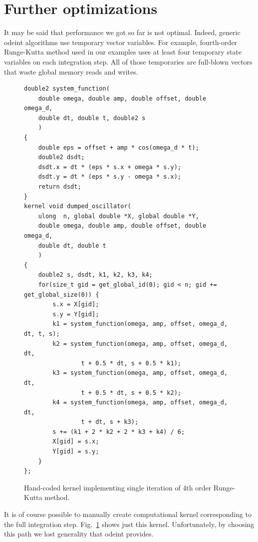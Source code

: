 \documentclass[1p]{elsarticle}
\newcommand{\figref}[1]{Fig.~\ref{#1}}
\begin{document}
\section{Further optimizations}

It may be said that performance we got so far is not optimal. Indeed, generic
odeint algorithms use temporary vector variables. For example, fourth-order
Runge-Kutta method used in our examples uses at least four temporary state
variables on each integration step. All of those temporaries are full-blown
vectors that waste global memory reads and writes. 

\begin{figure}[p]
\begin{lstlisting}
double2 system_function(
    double omega, double amp, double offset, double omega_d,
    double dt, double t, double2 s
    )
{
    double eps = offset + amp * cos(omega_d * t);
    double2 dsdt;
    dsdt.x = dt * (eps * s.x + omega * s.y);
    dsdt.y = dt * (eps * s.y - omega * s.x);
    return dsdt;
}
kernel void dumped_oscillator(
    ulong  n, global double *X, global double *Y,
    double omega, double amp, double offset, double omega_d,
    double dt, double t
    )
{
    double2 s, dsdt, k1, k2, k3, k4;
    for(size_t gid = get_global_id(0); gid < n; gid += get_global_size(0)) {
        s.x = X[gid];
        s.y = Y[gid];
        k1 = system_function(omega, amp, offset, omega_d, dt, t, s);
        k2 = system_function(omega, amp, offset, omega_d, dt,
                t + 0.5 * dt, s + 0.5 * k1);
        k3 = system_function(omega, amp, offset, omega_d, dt,
                t + 0.5 * dt, s + 0.5 * k2);
        k4 = system_function(omega, amp, offset, omega_d, dt,
                t + dt, s + k3);
        s += (k1 + 2 * k2 + 2 * k3 + k4) / 6;
        X[gid] = s.x;
        Y[gid] = s.y;
    }
};

\end{lstlisting}
\caption{Hand-coded kernel implementing single iteration of 4th order
Runge-Kutta method.}
\label{code:customkrn}
\end{figure}

It is of course possible to manually create computational kernel corresponding
to the full integration step. \figref{code:customkrn} shows just this
kernel. Unfortunately, by choosing this path we lost generality that odeint
provides.
\end{document}
